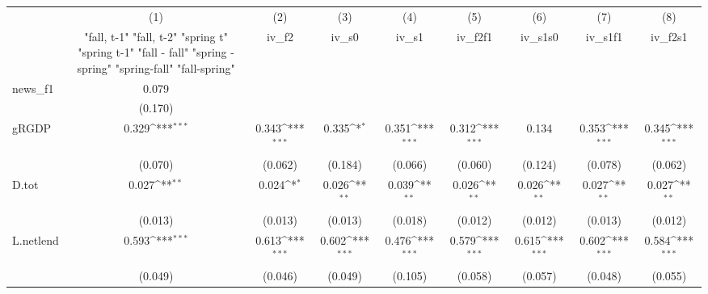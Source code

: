 {
\def\sym#1{\ifmmode^{#1}\else\(^{#1}\)\fi}
\begin{tabular}{l*{8}{c}}
\toprule
            &\multicolumn{1}{c}{(1)}&\multicolumn{1}{c}{(2)}&\multicolumn{1}{c}{(3)}&\multicolumn{1}{c}{(4)}&\multicolumn{1}{c}{(5)}&\multicolumn{1}{c}{(6)}&\multicolumn{1}{c}{(7)}&\multicolumn{1}{c}{(8)}\\
            &\multicolumn{1}{c}{  "fall, t-1" "fall, t-2" "spring t" "spring t-1"  "fall - fall" "spring - spring" "spring-fall" "fall-spring" }&\multicolumn{1}{c}{iv\_f2}&\multicolumn{1}{c}{iv\_s0}&\multicolumn{1}{c}{iv\_s1}&\multicolumn{1}{c}{iv\_f2f1}&\multicolumn{1}{c}{iv\_s1s0}&\multicolumn{1}{c}{iv\_s1f1}&\multicolumn{1}{c}{iv\_f2s1}\\
\midrule
news\_f1     &       0.079         &                     &                     &                     &                     &                     &                     &                     \\
            &     (0.170)         &                     &                     &                     &                     &                     &                     &                     \\
\addlinespace
gRGDP       &       0.329\sym{***}&       0.343\sym{***}&       0.335\sym{*}  &       0.351\sym{***}&       0.312\sym{***}&       0.134         &       0.353\sym{***}&       0.345\sym{***}\\
            &     (0.070)         &     (0.062)         &     (0.184)         &     (0.066)         &     (0.060)         &     (0.124)         &     (0.078)         &     (0.062)         \\
\addlinespace
D.tot       &       0.027\sym{**} &       0.024\sym{*}  &       0.026\sym{**} &       0.039\sym{**} &       0.026\sym{**} &       0.026\sym{**} &       0.027\sym{**} &       0.027\sym{**} \\
            &     (0.013)         &     (0.013)         &     (0.013)         &     (0.018)         &     (0.012)         &     (0.012)         &     (0.013)         &     (0.012)         \\
\addlinespace
L.netlend   &       0.593\sym{***}&       0.613\sym{***}&       0.602\sym{***}&       0.476\sym{***}&       0.579\sym{***}&       0.615\sym{***}&       0.602\sym{***}&       0.584\sym{***}\\
            &     (0.049)         &     (0.046)         &     (0.049)         &     (0.105)         &     (0.058)         &     (0.057)         &     (0.048)         &     (0.055)         \\

\end{tabular}}

